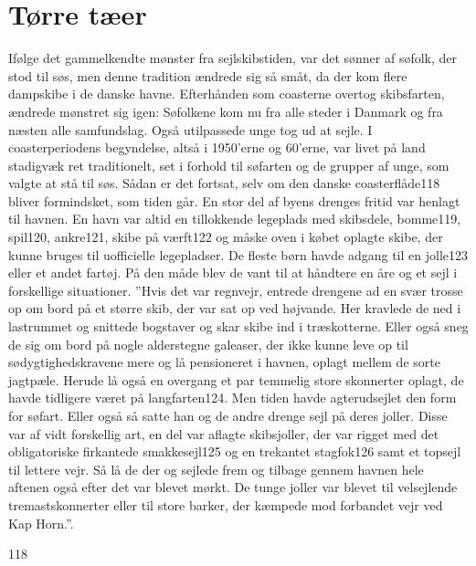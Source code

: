 \chapter{Tørre tæer}\label{tuxf8rre-tuxe6er}

Ifølge det gammelkendte mønster fra sejlskibstiden, var det sønner af
søfolk, der stod til søs, men denne tradition ændrede sig så småt, da
der kom flere dampskibe i de danske havne. Efterhånden som coasterne
overtog skibsfarten, ændrede mønstret sig igen: Søfolkene kom nu fra
alle steder i Danmark og fra næsten alle samfundslag. Også utilpassede
unge tog ud at sejle. I coasterperiodens begyndelse, altså i 1950'erne
og 60'erne, var livet på land stadigvæk ret traditionelt, set i forhold
til søfarten og de grupper af unge, som valgte at stå til søs. Sådan er
det fortsat, selv om den danske coasterflåde118 bliver formindsket, som
tiden går. En stor del af byens drenges fritid var henlagt til havnen.
En havn var altid en tillokkende legeplads med skibsdele, bomme119,
spil120, ankre121, skibe på værft122 og måske oven i købet oplagte
skibe, der kunne bruges til uofficielle legepladser. De fleste børn
havde adgang til en jolle123 eller et andet fartøj. På den måde blev de
vant til at håndtere en åre og et sejl i forskellige situationer. ''Hvis
det var regnvejr, entrede drengene ad en svær trosse op om bord på et
større skib, der var sat op ved højvande. Her kravlede de ned i
lastrummet og snittede bogstaver og skar skibe ind i træskotterne. Eller
også sneg de sig om bord på nogle alderstegne galeaser, der ikke kunne
leve op til sødygtighedskravene mere og lå pensioneret i havnen, oplagt
mellem de sorte jagtpæle. Herude lå også en overgang et par temmelig
store skonnerter oplagt, de havde tidligere været på langfarten124. Men
tiden havde agterudsejlet den form for søfart. Eller også så satte han
og de andre drenge sejl på deres joller. Disse var af vidt forskellig
art, en del var aflagte skibsjoller, der var rigget med det
obligatoriske firkantede smakkesejl125 og en trekantet stagfok126 samt
et topsejl til lettere vejr. Så lå de der og sejlede frem og tilbage
gennem havnen hele aftenen også efter det var blevet mørkt. De tunge
joller var blevet til velsejlende tremastskonnerter eller til store
barker, der kæmpede mod forbandet vejr ved Kap Horn.''.

118

